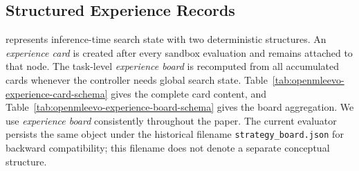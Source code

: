 \subsection{Structured Experience Records}
\label{app:openmleevo-experience-records}

\openmleevo{} represents inference-time search state with two deterministic structures. An \emph{experience card} is created after every sandbox evaluation and remains attached to that node. The task-level \emph{experience board} is recomputed from all accumulated cards whenever the controller needs global search state. Table~\ref{tab:openmleevo-experience-card-schema} gives the complete card content, and Table~\ref{tab:openmleevo-experience-board-schema} gives the board aggregation. We use \emph{experience board} consistently throughout the paper. The current evaluator persists the same object under the historical filename \nolinkurl{strategy_board.json} for backward compatibility; this filename does not denote a separate conceptual structure.

